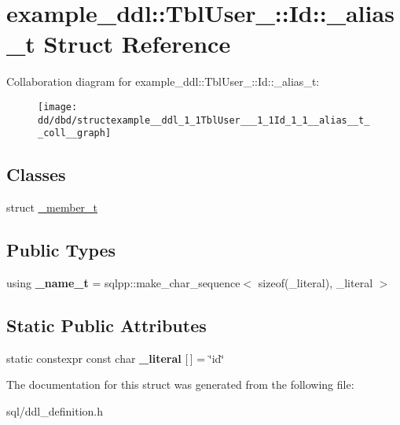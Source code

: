 \hypertarget{structexample__ddl_1_1TblUser___1_1Id_1_1__alias__t}{}\section{example\+\_\+ddl\+:\+:Tbl\+User\+\_\+\+:\+:Id\+:\+:\+\_\+alias\+\_\+t Struct Reference}
\label{structexample__ddl_1_1TblUser___1_1Id_1_1__alias__t}


Collaboration diagram for example\+\_\+ddl\+:\+:Tbl\+User\+\_\+\+:\+:Id\+:\+:\+\_\+alias\+\_\+t\+:
\nopagebreak
\begin{figure}[H]
\begin{center}
\leavevmode
\texttt{[image: dd/dbd/structexample\_\_ddl\_1\_1TblUser\_\_\_1\_1Id\_1\_1\_\_alias\_\_t\_\_coll\_\_graph]}
\end{center}
\end{figure}
\subsection*{Classes}
\begin{DoxyCompactItemize}
\item 
struct \hyperlink{structexample__ddl_1_1TblUser___1_1Id_1_1__alias__t_1_1__member__t}{\+\_\+member\+\_\+t}
\end{DoxyCompactItemize}
\subsection*{Public Types}
\begin{DoxyCompactItemize}
\item 
\hypertarget{structexample__ddl_1_1TblUser___1_1Id_1_1__alias__t_a6f011d22038d605cad60071fa35d67fe}{}using {\bfseries \+\_\+name\+\_\+t} = sqlpp\+::make\+\_\+char\+\_\+sequence$<$ sizeof(\+\_\+literal), \+\_\+literal $>$\label{structexample__ddl_1_1TblUser___1_1Id_1_1__alias__t_a6f011d22038d605cad60071fa35d67fe}

\end{DoxyCompactItemize}
\subsection*{Static Public Attributes}
\begin{DoxyCompactItemize}
\item 
\hypertarget{structexample__ddl_1_1TblUser___1_1Id_1_1__alias__t_a42c061aff6500cf1ff85f499b71a30e4}{}static constexpr const char {\bfseries \+\_\+literal} \mbox{[}$\,$\mbox{]} = \char`\"{}id\char`\"{}\label{structexample__ddl_1_1TblUser___1_1Id_1_1__alias__t_a42c061aff6500cf1ff85f499b71a30e4}

\end{DoxyCompactItemize}


The documentation for this struct was generated from the following file\+:\begin{DoxyCompactItemize}
\item 
sql/ddl\+\_\+definition.\+h\end{DoxyCompactItemize}
